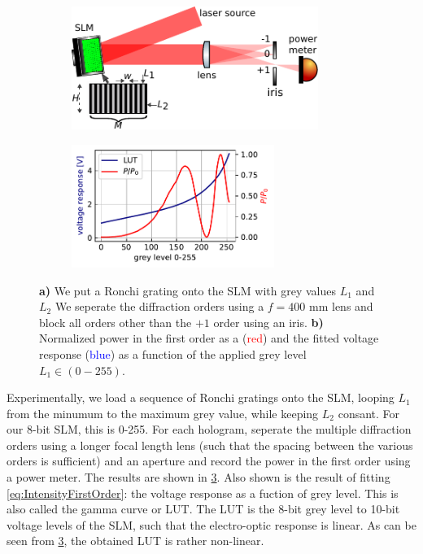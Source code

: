 \begin{figure}
	\begin{subfigure}{.54\linewidth}
		\includegraphics[height=4cm]{figures/LUTcalibrationSetup.pdf}
		\caption{}
		\label{fig:LUTCalibrationSetup}
	\end{subfigure}
	\hfill
	\begin{subfigure}{.44\linewidth}
		\includegraphics[height=4cm]{figures/LUTplot.pdf}
		\caption{}
		\label{fig:LUTcalibration}
	\end{subfigure}
	\caption{\textbf{a)} We put a Ronchi grating onto the SLM with grey values $L_1$ and $L_2$ We seperate the diffraction orders using a $f=400$ mm lens and block all orders other than the $+1$ order using an iris. 
	\textbf{b) }Normalized power in the first order as a (\textcolor{red}{red}) and the fitted voltage response (\textcolor{blue}{blue}) as a function of the applied grey level $L_1 \in (0-255)$.}
\end{figure}

Experimentally, we load a sequence of Ronchi gratings onto the SLM, looping $L_1$ from the minumum to the maximum grey value, while keeping $L_2$ consant. 
For our 8-bit SLM, this is 0-255. For each hologram, seperate the multiple diffraction orders using a longer focal length lens (such that the spacing between the various orders is sufficient) and an aperture and record the power in the first order using a power meter. 
The results are shown in \cref{fig:LUTcalibration}. Also shown is the result of fitting \cref{eq:IntensityFirstOrder}: the voltage response as a fuction of grey level. 
This is also called the gamma curve or \ac{LUT}.
The LUT is the 8-bit grey level to 10-bit voltage levels of the SLM, such that the electro-optic response is linear. 
As can be seen from \cref{fig:LUTcalibration}, the obtained LUT is rather non-linear.

